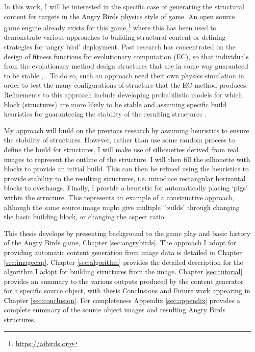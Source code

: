 \documentclass{dalthesis}
\begin{document}
In this work, I will be interested in the specific case of generating the structural content for targets in the Angry Birds physics style of game. An open source game engine already exists for this game,\footnote{\url{https://aibirds.org}} where this has been used to demonstrate various approaches to building structural content or defining strategies for `angry bird' deployment. Past research has concentrated on the design of fitness functions for evolutionary computation (EC), so that individuals from the evolutionary method design structures that are in some way guaranteed to be stable \cite{ferreira14}, \cite{ferreira18}. To do so, such an approach need their own physics simulation in order to test the many configurations of structure that the EC method produces. Refinements to this approach include developing probabilistic models for which block (structures) are more likely to be stable \cite{stephenson16} and assuming specific build heuristics for guaranteeing the stability of the resulting structures \cite{stephenson17}.

My approach will build on the previous research by assuming heuristics to ensure the stability of structures. However, rather than use some random process to define the build for structures, I will make use of silhouettes derived from real images to represent the outline of the structure. I will then fill the silhouette with blocks to provide an initial build. This can then be refined using the heuristics to provide stability to the resulting structures, i.e. introduce rectangular horizontal blocks to overhangs. Finally, I provide a heuristic for automatically placing `pigs' within the structure. This represents an example of a constructive approach, although the same source image might give multiple `builds' through changing the basic building block, or changing the aspect ratio.

This thesis develops by presenting background to the game play and basic history of the Angry Birds game, Chapter \ref{sec:angrybirds}. The approach I adopt for providing automatic content generation from image data is detailed in Chapter \ref{sec:imagecap}. Chapter \ref{sec:algorithm} provides the detailed description for the algorithm I adopt for building structures from the image. Chapter \ref{sec:tutorial} provides an summary to the various outputs produced by the content generator for a specific source object, with thesis Conclusions and Future work appearing in Chapter \ref{sec:conclusion}. For completeness Appendix \ref{sec:appendix} provides a complete summary of the source object images and resulting Angry Birds structures.
\end{document}
